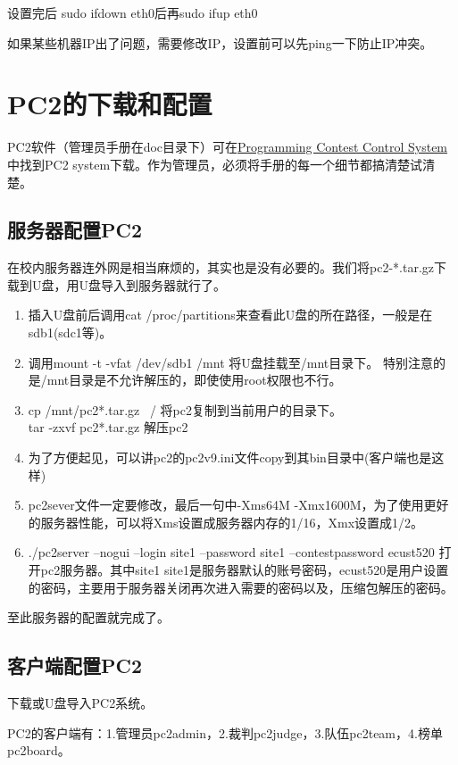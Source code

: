 \documentclass[12pt]{article}
\begin{document}
设置完后 sudo ifdown eth0后再sudo ifup eth0

如果某些机器IP出了问题，需要修改IP，设置前可以先ping一下防止IP冲突。

\section{PC2的下载和配置}

PC2软件（管理员手册在doc目录下）可在\href{http://www.ecs.csus.edu/pc2/}{Programming Contest Control System}中找到PC2 system下载。作为管理员，必须将手册的每一个细节都搞清楚试清楚。


\subsection{服务器配置PC2}
在校内服务器连外网是相当麻烦的，其实也是没有必要的。我们将pc2-*.tar.gz下载到U盘，用U盘导入到服务器就行了。
\begin{enumerate}
\item
插入U盘前后调用cat /proc/partitions来查看此U盘的所在路径，一般是在sdb1(sdc1等)。
\item
调用mount -t -vfat /dev/sdb1 /mnt 将U盘挂载至/mnt目录下。
特别注意的是/mnt目录是不允许解压的，即使使用root权限也不行。
\item
cp /mnt/pc2*.tar.gz ~/ 将pc2复制到当前用户的目录下。\\
tar -zxvf pc2*.tar.gz  解压pc2
\item
为了方便起见，可以讲pc2的pc2v9.ini文件copy到其bin目录中(客户端也是这样)
\item
{\color{green}{特别注意:}} pc2sever文件一定要修改，最后一句中-Xms64M -Xmx1600M，为了使用更好的服务器性能，可以将Xms设置成服务器内存的1/16，Xmx设置成1/2。
\item
{\color{green}{运行:}} ./pc2server --nogui --login site1 --password site1 --contestpassword ecust520 打开pc2服务器。其中site1 site1是服务器默认的账号密码，ecust520是用户设置的密码，主要用于服务器关闭再次进入需要的密码以及，压缩包解压的密码。
\end{enumerate}
至此服务器的配置就完成了。


\subsection{客户端配置PC2}

下载或U盘导入PC2系统。

PC2的客户端有：1.管理员pc2admin，2.裁判pc2judge，3.队伍pc2team，4.榜单pc2board。
\end{document}
